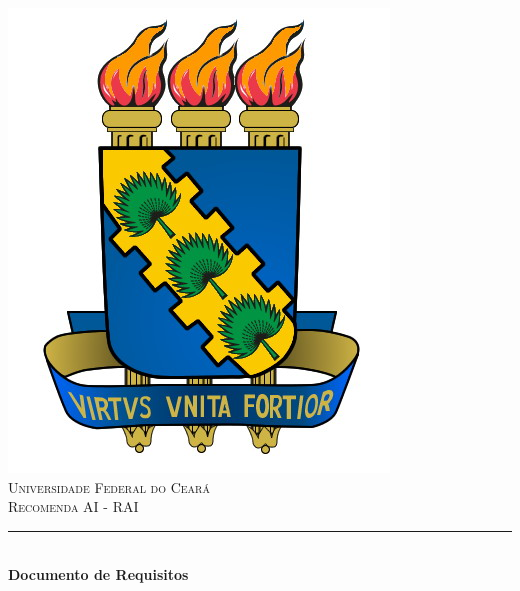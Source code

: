 \documentclass[11pt,a4paper,oneside]{article}
\author{Igo Ramalho Brilhante \and Tales Parente}
\newcommand{\HRule}{\rule{\linewidth}{0.5mm}}
\newcounter{uc-counter} \setcounter{uc-counter}{1}
\begin{document}
\newcommand{\ucform}[8][]{
\begin{itemize}
	\item Identificador: \textbf{#2}\textbf{\arabic{uc-counter}}
	\item Nome: #3
	\item Descrição: #4
	\item Prioridade: #5
	\item Fluxo de eventos: #6
	\item Pré-condições e restrições: #7
	\item Pós-condições: #8
\end{itemize}
}

\begin{titlepage}
\begin{center}

\includegraphics[scale=0.3]{../figuras/brasao_ufc.jpg}~\\[1cm]

\textsc{\LARGE Universidade Federal do Ceará}\\[1.5cm]

\textsc{\Large Recomenda AI - \textsc{RAI}}\\[0.5cm]

\HRule \\[0.4cm]
{ \huge \bfseries Documento de Requisitos}\\[0.4cm]


\end{center}
\end{titlepage}
\end{document}
